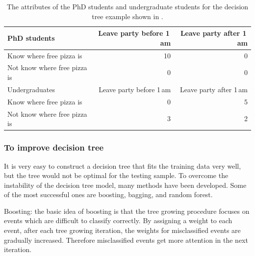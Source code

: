 \begin{table}[!htbp]\centering

\begin{tabular}{lrr}
\hline \hline
PhD students & Leave party before 1\,am  & Leave party after 1\,am\\
\hline
Know where free pizza is & 10 & 0 \\
Not know where free pizza is & 0 & 0 \\
\hline
Undergraduates & Leave party before 1\,am  & Leave party after 1\,am\\
\hline
Know where free pizza is & 0 & 5 \\
Not know where free pizza is & 3 & 2 \\
\hline \hline
\end{tabular}
\caption
{The attributes of  the PhD students and undergraduate students for the decision tree example shown in .}
\label{tab:doubleHiggsDecisionTreeComic2}
\end{table}


\subsubsection{To improve decision tree}



It is very easy to construct a decision tree that fits the training data very well, but the tree would not be optimal for the testing sample. To overcome the instability of the decision tree model, many methods have been developed. Some of the most successful ones are boosting, bagging, and random forest.

Boosting: the basic idea of boosting is that the tree growing procedure focuses on events which are difficult to classify correctly. By assigning a weight to each event,   after each tree growing iteration, the weights for misclassified events are gradually increased. Therefore misclassified events get more attention in the next iteration.


